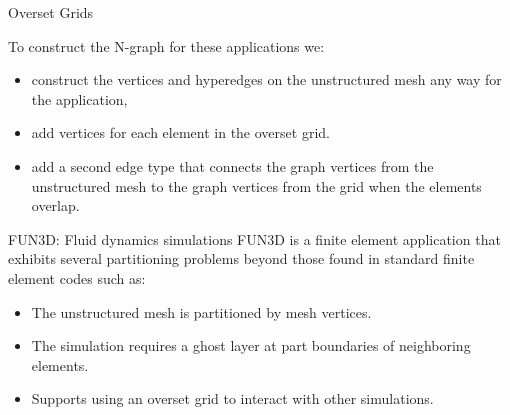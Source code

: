 \documentclass{beamer}
\begin{document}
\begin{textblock}{15.6}
\begin{textblock}{5}
\begin{block}{Overset Grids}
      
      To construct the N-graph for these applications we:
      \begin{itemize}
      \item construct the vertices and hyperedges on the unstructured mesh any way for the application,
      \item add vertices for each element in the overset grid.
      \item add a second edge type that connects the graph vertices from the unstructured mesh to the graph vertices from the grid when the elements overlap.
      \end{itemize}

      
    \end{block}
    
    \begin{block}{FUN3D: Fluid dynamics simulations}
      FUN3D is a finite element application that exhibits several partitioning problems beyond those found in standard finite element codes such as:
      \begin{itemize}
      \item The unstructured mesh is partitioned by mesh vertices.
      \item The simulation requires a ghost layer at part boundaries of neighboring elements.
      \item Supports using an overset grid to interact with other simulations.
      \end{itemize}



      
    \end{block}
  \end{textblock}
\end{textblock}
\end{document}
